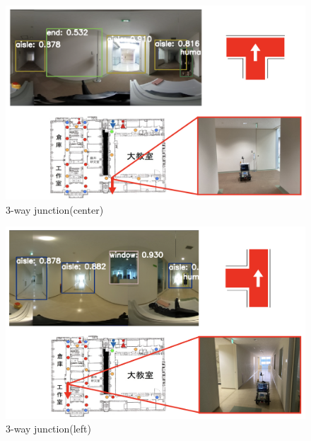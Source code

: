 \documentclass[../main]{subfiles}
\begin{document}
        \begin{figure}[H]
            \centering
            \includegraphics[scale=0.5]{../images/experiment_3way_center.png}
            \caption{3-way junction(center)}
            \label{figure::3way_junction_center}
        \end{figure}

        \begin{figure}[H]
            \centering
            \includegraphics[scale=0.5]{../images/experiment_3way_left.png}
            \caption{3-way junction(left)}
            \label{figure::3way_junction_left}
        \end{figure}
\end{document}
